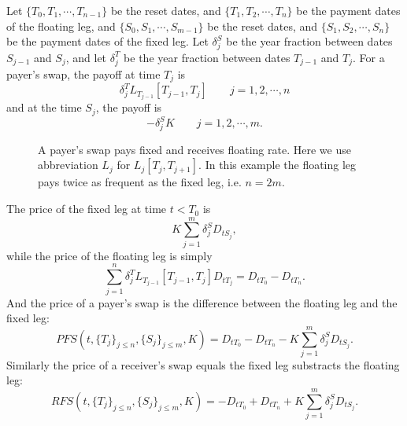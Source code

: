 Let $\{T_0,T_1,\cdots,T_{n-1}\}$ be the reset dates, and
$\{T_1,T_2,\cdots,T_{n}\}$ be the payment dates of the floating leg, and
$\{S_0,S_1,\cdots,S_{m-1}\}$ be the reset dates, and
$\{S_1,S_2,\cdots,S_{n}\}$ be the payment dates of the fixed leg. 
Let $\delta^S_j$ be the year fraction between dates $S_{j-1}$ and $S_{j}$,
and let $\delta^T_{j}$ be the year fraction between dates $T_{j-1}$ and 
$T_{j}$. For a payer's swap, the payoff at time $T_j$ is
\[
  \delta^T_j L_{T_{j-1}}[T_{j-1},T_j]  \qquad j=1,2,\cdots,n
\]
and at the time $S_j$, the payoff is
\[
  - \delta^S_j K  \qquad j=1,2,\cdots,m.
\]

\begin{figure}
  \caption{A payer's swap pays fixed and receives floating rate. Here we use
           abbreviation $L_j$ for $L_j[T_j,T_{j+1}]$. In this example the
           floating leg pays twice as frequent as the fixed leg, i.e. $n=2m$.}
  \label{F:swap}
\end{figure}

The price of the fixed leg at time $t<T_0$ is
\[
  K \sum_{j=1}^m \delta^S_j D_{tS_j},
\]
while the price of the floating leg is simply
\[
  \sum_{j=1}^n \delta^T_j L_{T_{j-1}}[T_{j-1},T_j] D_{tT_j}
    = D_{tT_0} - D_{tT_n}.
\]
And the price of a payer's swap is the difference between the floating leg and
the fixed leg:
\begin{equation}
  PFS(t,\{T_j\}_{j\le n},\{S_j\}_{j\le m},K)
    = D_{tT_0} - D_{tT_n} - K\sum_{j=1}^m \delta^S_j D_{tS_j}.
\end{equation}
Similarly the price of a receiver's swap equals the fixed leg substracts the
floating leg:
\begin{equation}
  RFS(t,\{T_j\}_{j\le n},\{S_j\}_{j\le m},K)
    = -D_{tT_0} + D_{tT_n} + K\sum_{j=1}^m \delta^S_j D_{tS_j}.
\end{equation}

